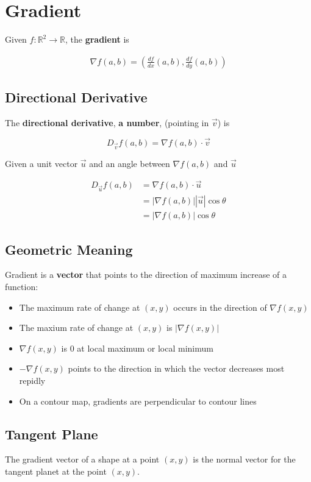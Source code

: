 \section{Gradient}

  Given $ f: \mathbb{R}^{2} \to \mathbb{R} $, the \textbf{gradient} is

  \begin{align}
    \nabla f \left( a, b \right) =
    \left(
      \frac{df}{dx} \left( a, b \right),
      \frac{df}{dy} \left( a, b \right)
    \right)
  \end{align}

  \subsection{Directional Derivative}

    The \textbf{directional derivative}, \textbf{a number}, (pointing in $ \vec{v} $) is

    \begin{equation}
      D_{\vec{v}} f \left( a, b \right) =
      \nabla f \left( a, b \right) \cdot \vec{v}
    \end{equation}

    Given a unit vector $ \vec{u} $ and an angle between
    $ \nabla f \left( a, b \right) $ and $ \vec{u} $

    \begin{align*}
      D_{\vec{u}} f \left( a, b \right) &=
      \nabla f \left( a, b \right) \cdot \vec{u} \\
      &= \left| \nabla f \left( a, b \right) \right|
      \left| \vec{u} \right| \cos\theta \\
      &= \left| \nabla f \left( a, b \right) \right| \cos\theta
    \end{align*}

  \subsection{Geometric Meaning}

    Gradient is a \textbf{vector} that
    points to the direction of maximum increase of a function:

    \begin{itemize}
      \item The maximum rate of change at $ \left( x, y \right) $
      occurs in the direction of $ \nabla f \left( x, y \right) $
      \item The maxium rate of change at $ \left( x, y \right) $  is
      $ \left| \nabla f \left( x, y \right) \right| $
      \item $ \nabla f \left( x, y \right) $ is $ 0 $ at local maximum or
      local minimum
      \item $ - \nabla f \left( x, y \right) $ points to the direction
      in which the vector decreases most repidly
      \item On a contour map, gradients are perpendicular to contour lines
    \end{itemize}

  \subsection{Tangent Plane}

    The gradient vector of a shape at a point $ (x, y) $ is the normal
    vector for the tangent planet at the point $ (x, y) $.